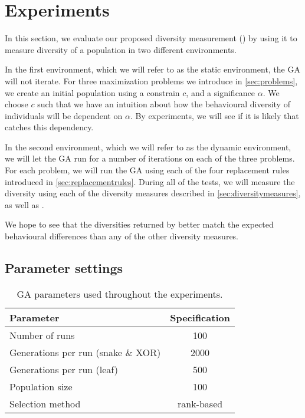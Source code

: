 \section{Experiments}
In this section, we evaluate our proposed diversity measurement (\dia) by using it to measure diversity of a population in two different environments.

In the first environment, which we will refer to as the static environment, the GA will not iterate.
For three maximization problems we introduce in \cref{sec:problems}, we create an initial population using a constrain $c$, and a significance $\alpha$. We choose $c$ such that we have an intuition about how the behavioural diversity of individuals will be dependent on $\alpha$. By experiments, we will see if it is likely that \dia{} catches this dependency.

In the second environment, which we will refer to as the dynamic environment, we will let the GA run for a number of iterations on each of the three problems. 
For each problem, we will run the GA using each of the four replacement rules introduced in \cref{sec:replacementrules}.
During all of the tests, we will measure the diversity using each of the diversity measures described in \cref{sec:diversitymeasures}, as well as \dia.

We hope to see that the diversities returned by \dia{} better match the expected behavioural differences than any of the other diversity measures.

\subsection{Parameter settings}

\begin{table}
  \centering
  \begin{tabular}{l S}
    \toprule
    Parameter & {Specification} \\
    \midrule
    Number of runs & 100 \\
    Generations per run (snake \& XOR) & 2000 \\
    Generations per run (leaf) & 500 \\
    Population size & 100 \\
    Selection method & {rank-based} \\
    \bottomrule
  \end{tabular}
  \caption{GA parameters used throughout the experiments.}
  \label{tab:gaparam}
\end{table}

